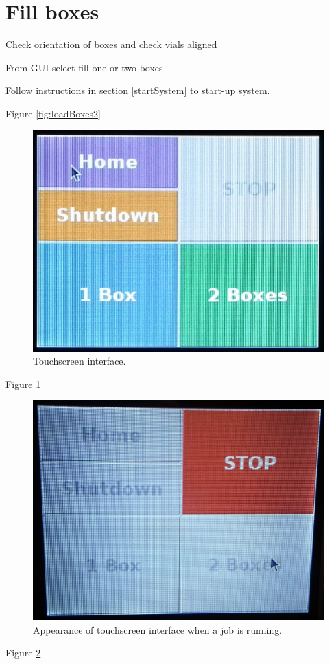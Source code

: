 \documentclass[]{book}
\theoremstyle{definition}
\theoremstyle{definition}
\theoremstyle{remark}
\begin{document}
\section{Fill boxes}\label{fill-boxes}

Check orientation of boxes and check vials aligned

From GUI select fill one or two boxes

Follow instructions in section \ref{startSystem} to start-up system.

Figure \ref{fig:loadBoxes2}

\begin{figure}

{\centering \includegraphics[width=0.6\linewidth]{images/gui} 

}

\caption{Touchscreen interface.}\label{fig:touchscreen}
\end{figure}

Figure \ref{fig:touchscreen}

\begin{figure}

{\centering \includegraphics[width=0.6\linewidth]{images/gui_stop2} 

}

\caption{Appearance of touchscreen interface when a job is running.}\label{fig:stopRobot}
\end{figure}

Figure \ref{fig:stopRobot}


\end{document}
